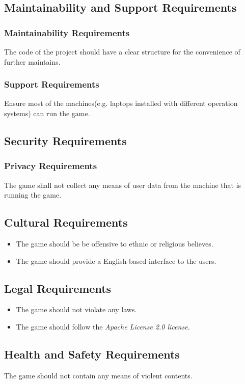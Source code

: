 \documentclass[12pt, titlepage]{article}
\begin{document}
\subsection{Maintainability and Support Requirements}
\subsubsection{Maintainability Requirements}
The code of the project should have a clear structure for the convenience of further maintains.
\subsubsection{Support Requirements}
Ensure most of the machines(e.g. laptops installed with different operation systems) can run the game.


\subsection{Security Requirements}
\subsubsection{Privacy Requirements}
The game shall not collect any means of user data from the machine that is running the game.

\subsection{Cultural Requirements}
\begin{itemize}
    \item The game should be be offensive to ethnic or religious believes.
    \item The game should provide a English-based interface to the users.
\end{itemize}

\subsection{Legal Requirements}
\begin{itemize}
    \item The game should not violate any laws.
    \item The game should follow the \textit{Apache License 2.0 license.}
\end{itemize}


\subsection{Health and Safety Requirements}
The game should not contain any means of violent contents.
\end{document}
